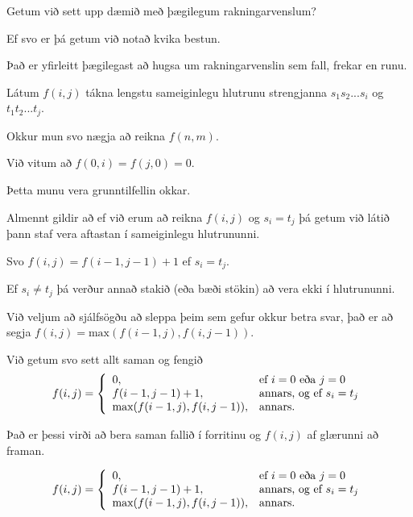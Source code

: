{
    {
        \item<1-> Getum við sett upp dæmið með þægilegum rakningarvenslum?
            \item<2-> Ef svo er þá getum við notað kvika bestun.
            \item<3-> Það er yfirleitt þægilegast að hugsa um rakningarvenslin sem fall, frekar en runu.
            \item<4-> Látum $f(i, j)$ tákna lengstu sameiginlegu hlutrunu strengjanna $s_1s_2...s_i$ og $t_1t_2...t_j$.
            \item<5-> Okkur mun svo nægja að reikna $f(n, m)$.
    }
}

{
    {
        \item<1-> Við vitum að $f(0, i) = f(j, 0) = 0$.
            \item<2-> Þetta munu vera grunntilfellin okkar.
            \item<3-> Almennt gildir að ef við erum að reikna $f(i, j)$ og $s_i = t_j$ þá getum við látið þann staf vera aftastan í sameiginlegu hlutrununni.
            \item<4-> Svo $f(i, j) = f(i - 1, j - 1) + 1$ ef $s_i = t_j$.
            \item<5-> Ef $s_i \neq t_j$ þá verður annað stakið (eða bæði stökin) að vera ekki í hlutrununni.
            \item<6-> Við veljum að sjálfsögðu að sleppa þeim sem gefur okkur betra svar, það er að segja $f(i, j) = \text{max}(f(i - 1, j), f(i, j - 1))$.
            \item<7-> Við getum svo sett allt saman og fengið
            \[
            f(i, j) =
                \left \{
                \env{array}
        {
            {l l}
            0, & \text{ef $i = 0$ eða $j = 0$}\\
                f(i - 1, j - 1) + 1, & \text{annars, og ef $s_i = t_j$}\\
                \text{max}(f(i - 1, j), f(i, j - 1)), & \text{annars}.
        }
        \right .
            \]
    }
}

{
}

{
    {
        \item<1-> Það er þessi virði að bera saman  fallið í forritinu og $f(i, j)$ af glærunni að framan.
    }
    \[
        f(i, j) =
            \left \{
            \env{array}
    {
        {l l}
        0, & \text{ef $i = 0$ eða $j = 0$}\\
            f(i - 1, j - 1) + 1, & \text{annars, og ef $s_i = t_j$}\\
            \text{max}(f(i - 1, j), f(i, j - 1)), & \text{annars}.
    }
    \right .
        \]
}

